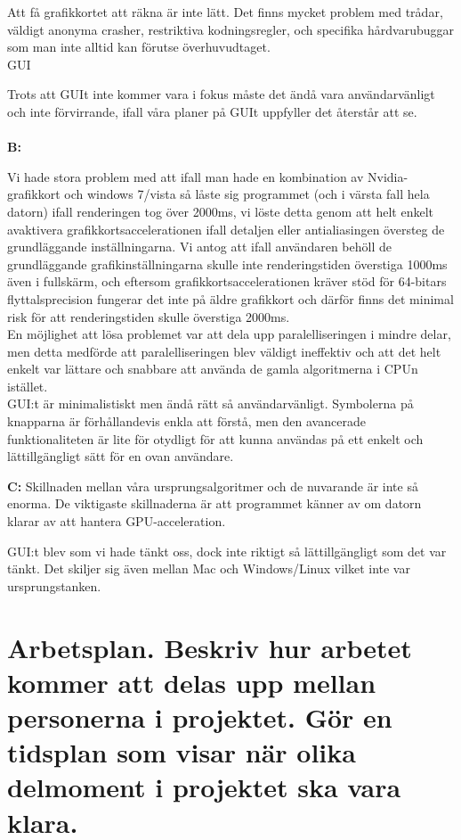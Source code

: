 \documentclass[11pt]{article} %
\begin{document}
\noindent Att få grafikkortet att räkna är inte lätt. Det finns mycket problem med trådar, väldigt anonyma crasher, restriktiva kodningsregler, och specifika hårdvarubuggar som man inte alltid kan förutse överhuvudtaget.
\\

\noindent GUI

\noindent Trots att GUIt inte kommer vara i fokus måste det ändå vara användarvänligt och inte förvirrande, ifall våra planer på GUIt uppfyller det återstår att se.
\\
\\
{\bf B:}

Vi hade stora problem med att ifall man hade en kombination av Nvidia-grafikkort och windows 7/vista så låste sig programmet (och i värsta fall hela datorn) ifall renderingen tog över 2000ms, vi löste detta genom att helt enkelt avaktivera grafikkortsaccelerationen ifall detaljen eller antialiasingen översteg de grundläggande inställningarna. Vi antog att ifall användaren behöll de grundläggande grafikinställningarna skulle inte renderingstiden överstiga 1000ms även i fullskärm, och eftersom grafikkortsaccelerationen kräver stöd för 64-bitars flyttalsprecision fungerar det inte på äldre grafikkort och därför finns det minimal risk för att renderingstiden skulle överstiga 2000ms. \\
En möjlighet att lösa problemet var att dela upp paralelliseringen i mindre delar, men detta medförde att paralelliseringen blev väldigt ineffektiv och att det helt enkelt var lättare och snabbare att använda de gamla algoritmerna i CPUn istället.\\

GUI:t är minimalistiskt men ändå rätt så användarvänligt. Symbolerna på knapparna är förhållandevis enkla att förstå, men den avancerade funktionaliteten är lite för otydligt för att kunna användas på ett enkelt och lättillgängligt sätt för en ovan användare.

{\bf C:} Skillnaden mellan våra ursprungsalgoritmer och de nuvarande är inte så enorma. De viktigaste skillnaderna är att programmet känner av om datorn klarar av att hantera GPU-acceleration.

\noindent GUI:t blev som vi hade tänkt oss, dock inte riktigt så lättillgängligt som det var tänkt. Det skiljer sig även mellan Mac och Windows/Linux vilket inte var ursprungstanken.

\section{Arbetsplan. Beskriv hur arbetet kommer att delas upp mellan personerna i projektet. Gör en tidsplan som visar när olika delmoment i projektet ska vara klara.}
\end{document}
